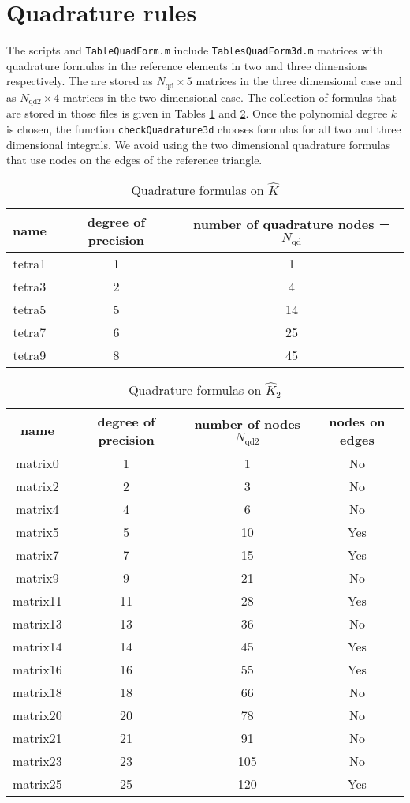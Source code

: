 \documentclass[10pt,english]{article}
\newcommand{\Nnd}{{N_{\mathrm{qd}}}}
\newcommand{\Nndb}{{N_{\mathrm{qd2}}}}
\begin{document}





\section{Quadrature rules}

The scripts and {\tt TableQuadForm.m} include {\tt TablesQuadForm3d.m} matrices with quadrature formulas in the reference elements in two and three dimensions respectively. The are stored as $\Nnd\times 5$ matrices in the three dimensional case and as  $\Nndb\times 4$ matrices in the two dimensional case. The collection of formulas that are stored in those files is given in Tables \ref{6Table1} and \ref{6Table2}. Once the polynomial degree $k$ is chosen, the function {\tt checkQuadrature3d} chooses formulas for all two and three dimensional integrals. We avoid using the two dimensional quadrature formulas that use nodes on the edges of the reference triangle.

\begin{table}[!ht]
\centering
\begin{tabular}{|c| c| c| }
\hline
name &  degree of precision  & number of quadrature nodes = $\Nnd$\\
\hline
tetra1 & 1 & 1\\
tetra3 & 2 & 4 \\
tetra5& 5 & 14\\
tetra7 & 6 & 25 \\
tetra9& 8 & 45\\
\hline
\end{tabular}
\caption{Quadrature formulas on $\widehat K$}\label{6Table1}
\end{table}

\begin{table}[h]
\centering
\begin{tabular}{|c|c|c|c|}
	\hline
name 	&  degree of precision    &   number of nodes $\Nndb$  & nodes on edges \\
	\hline
matrix0 &  1	 &	 1	&  No\\
matrix2 &  2	 &	 3	&  No\\
matrix4 & 4 & 6& No\\
matrix5 & 5& 10 &Yes\\
matrix7 &7 &15& Yes\\
matrix9 & 9 & 21 & No\\
matrix11 & 11 & 28 & Yes\\
matrix13 & 13 & 36& No\\
matrix14 & 14 & 45 &Yes\\
matrix16 & 16 & 55& Yes\\
matrix18& 18& 66 &No\\
matrix20&20&78&No\\
matrix21 & 21 &91& No\\
matrix23 & 23&105&No\\
matrix25 & 25& 120 &Yes\\		
	\hline
\end{tabular}
\caption{Quadrature formulas on $\widehat K_2$}\label{6Table2}
\end{table}
\end{document}
